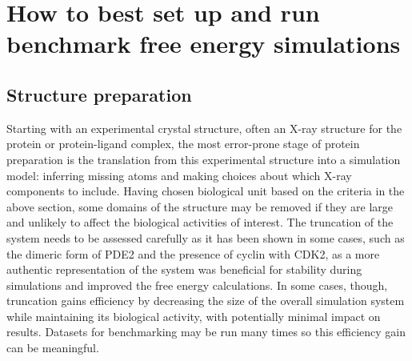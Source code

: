 \documentclass[9pt,bestpractices]{livecoms}
\begin{document}
 
\section{How to best set up and run benchmark free energy simulations}

\subsection{Structure preparation}
\label{sec:prep}

Starting with an experimental crystal structure, often an X-ray structure for the protein or protein-ligand complex, the most error-prone stage of protein preparation is the translation from this experimental structure into a simulation model: inferring missing atoms and making choices about which X-ray components to include. Having chosen biological unit based on the criteria in the above section, some domains of the structure may be removed if they are large and unlikely to affect the biological activities of interest. The truncation of the system needs to be assessed carefully as it has been shown in some cases, such as the dimeric form of PDE2 and the presence of cyclin with CDK2, as a more authentic representation of the system was beneficial for stability during simulations and improved the free energy calculations. In some cases, though, truncation gains efficiency by decreasing the size of the overall simulation system while maintaining its biological activity, with potentially minimal impact on results. Datasets for benchmarking may be run many times so this efficiency gain can be meaningful. 
\end{document}

